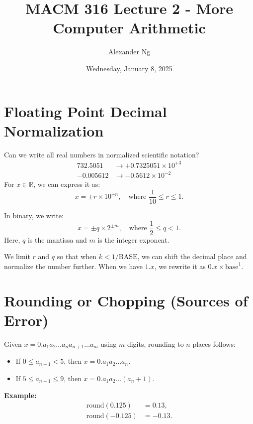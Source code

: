 \documentclass[12pt]{article}
\begin{document}
\title{MACM 316 Lecture 2 - More Computer Arithmetic}
\author{Alexander Ng}
\date{Wednesday, January 8, 2025}

\maketitle

\section{Floating Point Decimal Normalization}

Can we write all real numbers in normalized scientific notation?
\begin{align*}
    732.5051 &\rightarrow +0.7325051 \times 10^{+3} \\
    -0.005612 &\rightarrow -0.5612 \times 10^{-2}
\end{align*}
For $x \in \mathbb{R}$, we can express it as:
\begin{equation*}
    x = \pm r \times 10^{\pm n}, \quad \text{where } \frac{1}{10} \leq r \leq 1.
\end{equation*}

In binary, we write:
\begin{equation*}
    x = \pm q \times 2^{\pm m}, \quad \text{where } \frac{1}{2} \leq q < 1.
\end{equation*}
Here, $q$ is the mantissa and $m$ is the integer exponent.

We limit $r$ and $q$ so that when $k < 1/\text{BASE}$, we can shift the decimal 
place and normalize the number further. When we have $1.x$, we rewrite it 
as $0.x \times \text{base}^1$.

\section{Rounding or Chopping (Sources of Error)}

Given $x = 0.a_1 a_2 \dots a_n a_{n+1} \dots a_m$ using $m$ digits, rounding 
to $n$ places follows:
\begin{itemize}
    \item If $0 \leq a_{n+1} < 5$, then $x = 0.a_1 a_2 \dots a_n$.
    \item If $5 \leq a_{n+1} \leq 9$, then $x = 0.a_1 a_2 \dots (a_n + 1)$.
\end{itemize}

\textbf{Example:}
\begin{align*}
    \text{round}(0.125) &= 0.13, \\
    \text{round}(-0.125) &= -0.13.
\end{align*}
\end{document}

